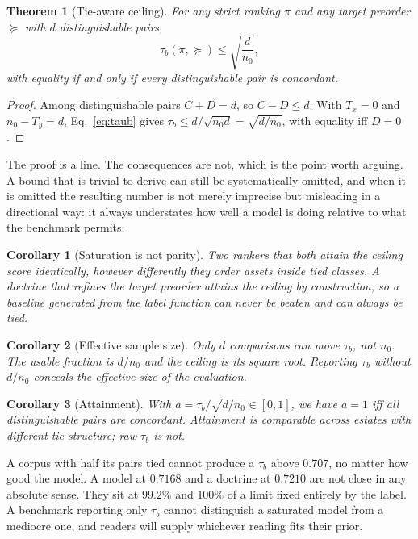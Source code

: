 \documentclass[journal,10pt]{IEEEtran}
\newtheorem{theorem}{Theorem}
\newtheorem{corollary}{Corollary}
\newcommand{\tb}{\tau_b}
\newcommand{\distinct}{d}
\newcommand{\nzero}{n_0}
\begin{document}
\begin{theorem}[Tie-aware ceiling]
\label{thm:ceiling}
For any strict ranking $\pi$ and any target preorder $\succeq$ with $\distinct$ distinguishable
pairs,
\begin{equation}
\tb(\pi,\succeq)\le\sqrt{\frac{\distinct}{\nzero}},
\label{eq:ceiling}
\end{equation}
with equality if and only if every distinguishable pair is concordant.
\end{theorem}
\begin{proof}
Among distinguishable pairs $C+D=\distinct$, so $C-D\le\distinct$. With $T_x=0$ and
$\nzero-T_y=\distinct$, Eq.~\eqref{eq:taub} gives
$\tb\le\distinct/\sqrt{\nzero\distinct}=\sqrt{\distinct/\nzero}$, with equality iff $D=0$.
\end{proof}

The proof is a line. The consequences are not, which is the point worth arguing. A bound that is
trivial to derive can still be systematically omitted, and when it is omitted the resulting number
is not merely imprecise but misleading in a directional way: it always understates how well a
model is doing relative to what the benchmark permits.

\begin{corollary}[Saturation is not parity]
\label{cor:saturation}
Two rankers that both attain the ceiling score identically, however differently they order assets
inside tied classes. A doctrine that refines the target preorder attains the ceiling by
construction, so a baseline generated from the label function can never be beaten and can always be
tied.
\end{corollary}

\begin{corollary}[Effective sample size]
\label{cor:effective}
Only $\distinct$ comparisons can move $\tb$, not $\nzero$. The usable fraction is
$\distinct/\nzero$ and the ceiling is its square root. Reporting $\tb$ without $\distinct/\nzero$
conceals the effective size of the evaluation.
\end{corollary}

\begin{corollary}[Attainment]
\label{cor:attain}
With $a=\tb/\sqrt{\distinct/\nzero}\in[0,1]$, we have $a=1$ iff all distinguishable pairs are
concordant. Attainment is comparable across estates with different tie structure; raw $\tb$ is not.
\end{corollary}

A corpus with half its pairs tied cannot produce a $\tb$ above $0.707$, no matter how good the
model. A model at $0.7168$ and a doctrine at $0.7210$ are not close in any absolute sense. They sit
at $99.2\%$ and $100\%$ of a limit fixed entirely by the label. A benchmark reporting only $\tb$
cannot distinguish a saturated model from a mediocre one, and readers will supply whichever
reading fits their prior.
\end{document}
